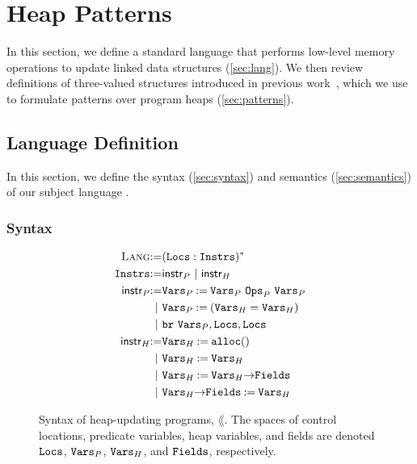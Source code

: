 
\section{Heap Patterns}
\label{sec:heap-patterns}
%
In this section, we define a standard language that performs low-level
memory operations to update linked data structures
(\autoref{sec:lang}).
%
We then review definitions of three-valued structures introduced in
previous work~\cite{sagiv02}, which we use to formulate patterns over
program heaps (\autoref{sec:patterns}).

\subsection{Language Definition}
\label{sec:lang}
%
In this section, we define the syntax (\autoref{sec:syntax}) and
semantics (\autoref{sec:semantics}) of our subject language \lang.

\subsubsection{Syntax}
\label{sec:syntax}
\begin{figure}
  \centering
  \begin{align}
    \textsc{Lang} \mathbin{:=} & (\mathtt{Locs}: \mathtt{Instrs})^{*} \label{line:prog} \\
    \mathtt{Instrs} \mathbin{:=} & \mathsf{instr}_P\ |\ \mathsf{instr}_H \label{line:instrs} \\
    \mathsf{instr}_P \mathbin{:=} &
    \mathtt{Vars}_P \mathbin{:=} \mathtt{Vars}_P\ \mathtt{Ops}_P\ \mathtt{Vars}_P
    \label{line:bool-op} \\
    |\ & \mathtt{Vars}_P \mathbin{:=} (\mathtt{Vars}_H = \mathtt{Vars}_H)
    \label{line:test-eq} \\
    |\ & \mathtt{br}\ \mathtt{Vars}_P, \mathtt{Locs}, \mathtt{Locs} \label{line:branch} \\
    \mathsf{instr}_H \mathbin{:=} & \mathtt{Vars}_H \mathbin{:=} \mathtt{alloc}()
    \label{line:alloc} \\
    |\ & \mathtt{Vars}_H \mathbin{:=} \mathtt{Vars}_H \label{line:copy} \\
    |\ & \mathtt{Vars}_H \mathbin{:=} \mathtt{Vars}_H \mathtt{->} \mathtt{Fields}
    \label{line:load} \\
    |\ & \mathtt{Vars}_H \mathtt{->} \mathtt{Fields} \mathbin{:=} \mathtt{Vars}_H
    \label{line:store}
  \end{align}
  \caption{Syntax of heap-updating programs, $\lang$.
    The spaces of control locations, predicate variables, heap
    variables, and fields are denoted $\mathtt{Locs}$, $\mathtt{Vars}_P$,
    $\mathtt{Vars}_H$, and $\mathtt{Fields}$, respectively.
  }
  \label{fig:syntax}
\end{figure}

